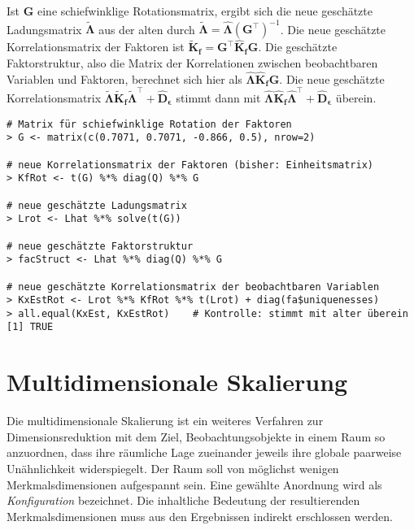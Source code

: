 Ist $\bm{G}$ eine schiefwinklige Rotationsmatrix, ergibt sich die neue geschätzte Ladungsmatrix $\tilde{\bm{\Lambda}}$ aus der alten durch $\tilde{\bm{\Lambda}} = \hat{\bm{\Lambda}} (\bm{G}^{\top})^{-1}$. Die neue geschätzte Korrelationsmatrix der Faktoren ist $\tilde{\bm{K}}_{\bm{f}} = \bm{G}^{\top} \hat{\bm{K}}_{\bm{f}} \bm{G}$. Die geschätzte Faktorstruktur, also die Matrix der Korrelationen zwischen beobachtbaren Variablen und Faktoren, berechnet sich hier als $\hat{\bm{\Lambda}} \hat{\bm{K}}_{\bm{f}} \bm{G}$. Die neue geschätzte Korrelationsmatrix $\tilde{\bm{\Lambda}} \tilde{\bm{K}}_{\bm{f}} \tilde{\bm{\Lambda}}^{\top} + \hat{\bm{D}}_{\bm{\epsilon}}$ stimmt dann mit $\hat{\bm{\Lambda}} \hat{\bm{K}}_{\bm{f}} \hat{\bm{\Lambda}}^{\top} + \hat{\bm{D}}_{\bm{\epsilon}}$ überein.
\begin{lstlisting}
# Matrix für schiefwinklige Rotation der Faktoren
> G <- matrix(c(0.7071, 0.7071, -0.866, 0.5), nrow=2)

# neue Korrelationsmatrix der Faktoren (bisher: Einheitsmatrix)
> KfRot <- t(G) %*% diag(Q) %*% G

# neue geschätzte Ladungsmatrix
> Lrot <- Lhat %*% solve(t(G))

# neue geschätzte Faktorstruktur
> facStruct <- Lhat %*% diag(Q) %*% G

# neue geschätzte Korrelationsmatrix der beobachtbaren Variablen
> KxEstRot <- Lrot %*% KfRot %*% t(Lrot) + diag(fa$uniquenesses)
> all.equal(KxEst, KxEstRot)    # Kontrolle: stimmt mit alter überein
[1] TRUE
\end{lstlisting}

\section{Multidimensionale Skalierung}
\label{sec:multMDS}

Die multidimensionale Skalierung ist ein weiteres Verfahren zur Dimensionsreduktion mit dem Ziel, Beobachtungsobjekte in einem Raum so anzuordnen, dass ihre räumliche Lage zueinander jeweils ihre globale paarweise Unähnlichkeit widerspiegelt. Der Raum soll von möglichst wenigen Merkmalsdimensionen aufgespannt sein. Eine gewählte Anordnung wird als \emph{Konfiguration} bezeichnet. Die inhaltliche Bedeutung der resultierenden Merkmalsdimensionen muss aus den Ergebnissen indirekt erschlossen werden.

